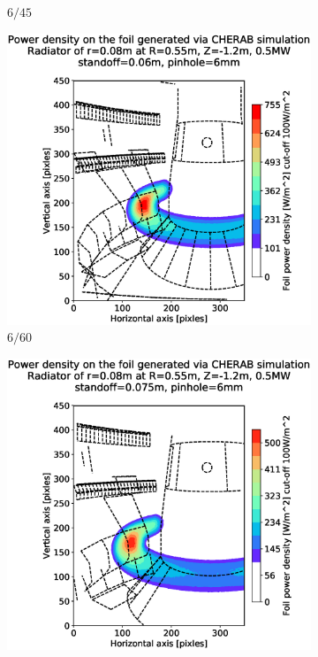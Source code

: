 \begin{figure}[!ht]
\begin{subfigure}{0.32\textwidth}
         \caption{$6/45$}
         \label{fig:6_45}
     \end{subfigure}
     \hfill
     \begin{subfigure}{0.31\textwidth}
         \centering
         \includegraphics[trim={85 25 57 80},clip,width=\textwidth]{Chapters/chapter2/figs/measured_power_6_60radiator_R0.55_Z-1.2_r0.08.stl.eps}
         \caption{$6/60$}
         \label{fig:6_60}
     \end{subfigure}
     \hfill
     \begin{subfigure}{0.325\textwidth}
         \centering
         \includegraphics[trim={85 25 40 80},clip,width=\textwidth]{Chapters/chapter2/figs/measured_power_6_75radiator_R0.55_Z-1.2_r0.08.stl.eps}

\end{subfigure}
\end{figure}
